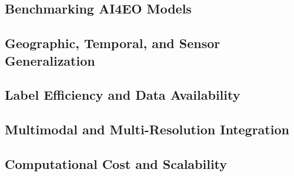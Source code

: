 \documentclass[
    11pt,
    a4paper,
    parskip=half,
    bibliography=totoc,
    numbers=noenddot
]{scrartcl}
\begin{document}
\subsection{Benchmarking AI4EO Models}


\subsection{Geographic, Temporal, and Sensor Generalization}


\subsection{Label Efficiency and Data Availability}


\subsection{Multimodal and Multi-Resolution Integration}


\subsection{Computational Cost and Scalability}

\end{document}
